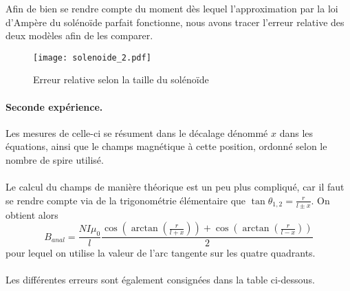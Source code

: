 Afin de bien se rendre compte du moment dès lequel l'approximation par la loi d'Ampère du solénoïde parfait fonctionne, nous avons tracer l'erreur relative des deux modèles afin de les comparer.

\begin{figure}[H]
\centering
\texttt{[image: solenoide\_2.pdf]}

\caption{Erreur relative selon la taille du solénoïde}
\end{figure}

\paragraph*{Seconde expérience.} Les mesures de celle-ci se résument dans le décalage dénommé $x$ dans les équations, ainsi que le champs magnétique à cette position, ordonné selon le nombre de spire utilisé.\\ \\
Le calcul du champs de manière théorique est un peu plus compliqué, car il faut se rendre compte via de la trigonométrie élémentaire que $\tan \theta_{1,2} = \frac{r}{l \pm x}$. On obtient alors 
$$ B_{anal} = \frac{N I \mu_0}{l} \frac{\cos \left( \arctan \left( \frac{r}{l+x} \right) \right) + \cos \left( \arctan \left( \frac{r}{l-x} \right) \right)}{2} $$
pour lequel on utilise la valeur de l'arc tangente sur les quatre quadrants.\\ \\
Les différentes erreurs sont également consignées dans la table ci-dessous.

